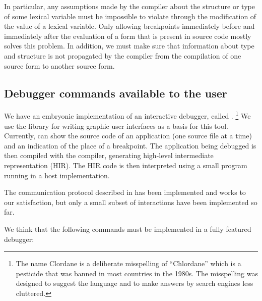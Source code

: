 In particular, any assumptions made by the compiler about the
structure or type of some lexical variable must be impossible to
violate through the modification of the value of a lexical variable.
Only allowing breakpoints immediately before and immediately after the
evaluation of a form that is present in source code mostly solves this
problem.  In addition, we must make sure that information about type
and structure is not propagated by the compiler from the compilation
of one source form to another source form.

\subsection{Debugger commands available to the user}

We have an embryonic implementation of an interactive debugger, called
\clordane{}.%
\footnote{The name Clordane is a deliberate misspelling of
  ``Chlordane'' which is a pesticide that was banned in most countries
  in the 1980s.  The misspelling was designed to suggest the
  \commonlisp{} language and to make answers by search engines less
  cluttered.}
We use the \mcclim{} library for writing graphic user
interfaces as a basis for this tool.  Currently, \clordane{} can show
the source code of an application (one source file at a time) and an
indication of the place of a breakpoint.  The application being
debugged is then compiled with the \sicl{} compiler, generating
high-level intermediate representation (HIR).  The HIR code is then
interpreted using a small program running in a host \commonlisp{}
implementation.

The communication protocol described in
 has been implemented
and works to our satisfaction, but only a small subset of interactions
have been implemented so far.

We think that the following commands must be implemented in a fully
featured debugger:

